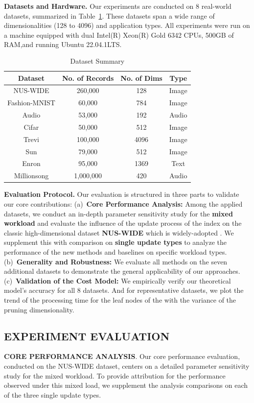 \noindent \textbf{Datasets and Hardware.} 
%
Our experiments are conducted on 8 real-world datasets, summarized in Table~\ref{tab:dataset}. These datasets span a wide range of dimensionalities (128 to 4096) and application types. All experiments were run on a machine equipped with dual Intel(R) Xeon(R) Gold 6342 CPUs, 500GB of RAM,and running Ubuntu 22.04.1LTS.
\begin{table}[htb]
\centering
\caption{Dataset Summary}
\label{tab:dataset}
\begin{tabular}{|c|c|c|c|}
\hline
\textbf{Dataset} & \textbf{No. of Records} & \textbf{No. of Dims} & \textbf{Type}\\
\hline
    NUS-WIDE & 260,000 & 128 & Image\\
    Fashion-MNIST & 60,000 & 784 & Image\\
    Audio & 53,000 & 192 & Audio\\
    Cifar & 50,000 & 512 & Image\\
    Trevi & 100,000 & 4096 & Image\\
    Sun & 79,000 & 512 & Image\\
    Enron & 95,000 & 1369 & Text\\
    Millionsong & 1,000,000 & 420 & Audio\\
\hline
\end{tabular}
\end{table}

\noindent \textbf{Evaluation Protocol.}
 Our evaluation is structured in three parts to validate our core contributions: (a)~\textbf{Core Performance Analysis:} Among the applied datasets, we conduct an in-depth parameter sensitivity study for the \textbf{mixed workload} and evaluate the influence of the update process of the \dualtree index on the classic high-dimensional dataset \textbf{NUS-WIDE} which is widely-adopted \cite{hussain2024gradual}. We supplement this with comparison on \textbf{single update types} to analyze the performance of the new methods and baselines on specific workload types. (b)~\textbf{Generality and Robustness:} We evaluate all methods on the seven additional datasets  to demonstrate the general applicability of our approaches. (c)~\textbf{Validation of the Cost Model:} We empirically verify our theoretical model's accuracy for all 8 datasets. And for representative datasets, we plot the trend of the processing time for the leaf nodes of the \dualtree with the variance of the pruning dimensionality.

\subsection{EXPERIMENT EVALUATION}
\noindent\textbf{CORE PERFORMANCE ANALYSIS}. Our core performance evaluation, conducted on the NUS-WIDE dataset, centers on a detailed parameter sensitivity study for the mixed workload. To provide attribution for the performance observed under this mixed load, we supplement the analysis comparisons on each of the three single update types. 

